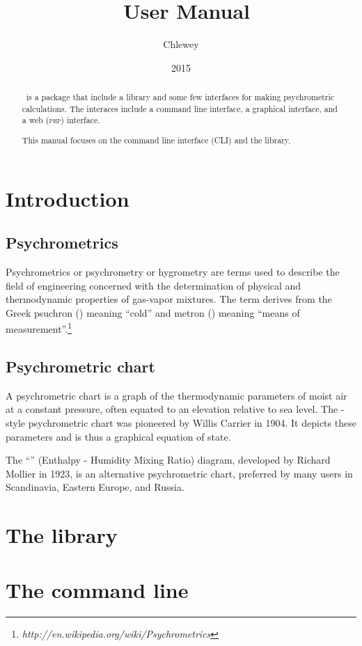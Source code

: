 \documentclass[letterpaper]{article}
\title{\psicret~User Manual}
\author{Chlewey}
\date{2015}
\begin{document}
\maketitle
\begin{abstract}
\psicret\ is a package that include a library and some few interfaces
for making psychrometric calculations.
The interaces include a command line interface, a graphical interface,
and a web (\textsc{php}) interface.

This manual focuses on the command line interface (CLI) and the library.
\end{abstract}
\tableofcontents
\section{Introduction}
\subsection{Psychrometrics}
Psychrometrics or psychrometry or hygrometry are terms used to describe
the field of engineering concerned with the determination of physical
and thermodynamic properties of gas-vapor mixtures. The term derives
from the Greek psuchron () meaning ``cold'' and metron
() meaning ``means of measurement''.\footnote{%
\textit{http://en.wikipedia.org/wiki/Psychrometrics}}
\subsection{Psychrometric chart}
A psychrometric chart is a graph of the thermodynamic parameters of
moist air at a constant pressure, often equated to an elevation relative
to sea level. The \ashrae-style psychrometric chart was pioneered by
Willis Carrier in 1904. It depicts these parameters and is thus a
graphical equation of state.

The ``\mollier'' (Enthalpy - Humidity Mixing Ratio) diagram,
developed by Richard Mollier in 1923, is an alternative psychrometric
chart, preferred by many users in Scandinavia, Eastern Europe, and
Russia.
\section{The library}
\section{The command line}
\end{document}
